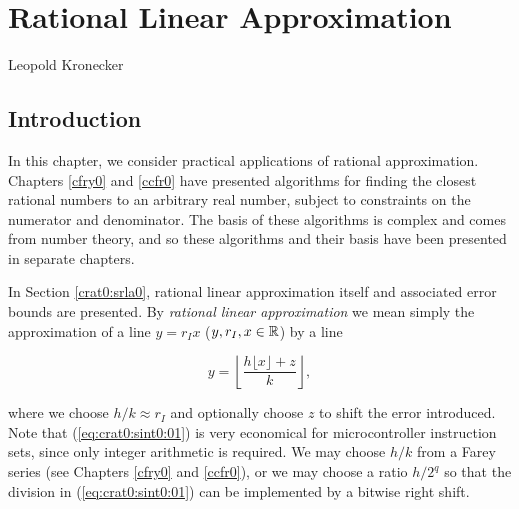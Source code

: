 \chapter{Rational Linear Approximation}

\label{crat0}

                   {Leopold Kronecker}

\section{Introduction}
\label{crat0:sint0}

In this chapter, we consider practical applications of
rational approximation.
Chapters \ref{cfry0} and \ref{ccfr0}
have presented algorithms for finding 
the closest rational numbers to an arbitrary real number,
subject to constraints on the numerator and denominator.
The basis of these algorithms is complex and comes from number theory, and so
these algorithms and their basis have been presented in separate chapters.

In Section \ref{crat0:srla0}, rational linear approximation itself
and associated error bounds are presented.  By \emph{rational linear
approximation} we mean simply the approximation of a line
$y = r_I x$ ($y, r_I, x \in {\mathbb{R}}$) by a line

\begin{equation}
\label{eq:crat0:sint0:01}
y = \left\lfloor
    \frac{h \lfloor x \rfloor + z}{k}
    \right\rfloor ,
\end{equation}

\noindent{}where we choose $h/k \approx r_I$ and optionally choose $z$ to 
shift the error introduced.  Note that (\ref{eq:crat0:sint0:01}) is
very economical for microcontroller instruction sets, since only integer
arithmetic is required.  We may choose $h/k$ from a Farey series (see
Chapters \ref{cfry0} and \ref{ccfr0}), or 
we may choose a ratio $h/2^q$ so that the division in (\ref{eq:crat0:sint0:01})
can be implemented
by a bitwise right shift.

